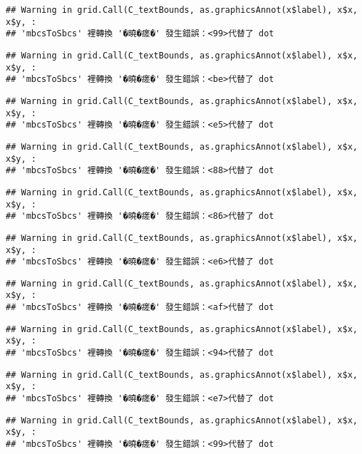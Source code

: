 \documentclass[
]{article}
\begin{document}
\begin{verbatim}
## Warning in grid.Call(C_textBounds, as.graphicsAnnot(x$label), x$x, x$y, :
## 'mbcsToSbcs' 裡轉換 '�曉�瘥�' 發生錯誤：<99>代替了 dot
\end{verbatim}

\begin{verbatim}
## Warning in grid.Call(C_textBounds, as.graphicsAnnot(x$label), x$x, x$y, :
## 'mbcsToSbcs' 裡轉換 '�曉�瘥�' 發生錯誤：<be>代替了 dot
\end{verbatim}

\begin{verbatim}
## Warning in grid.Call(C_textBounds, as.graphicsAnnot(x$label), x$x, x$y, :
## 'mbcsToSbcs' 裡轉換 '�曉�瘥�' 發生錯誤：<e5>代替了 dot
\end{verbatim}

\begin{verbatim}
## Warning in grid.Call(C_textBounds, as.graphicsAnnot(x$label), x$x, x$y, :
## 'mbcsToSbcs' 裡轉換 '�曉�瘥�' 發生錯誤：<88>代替了 dot
\end{verbatim}

\begin{verbatim}
## Warning in grid.Call(C_textBounds, as.graphicsAnnot(x$label), x$x, x$y, :
## 'mbcsToSbcs' 裡轉換 '�曉�瘥�' 發生錯誤：<86>代替了 dot
\end{verbatim}

\begin{verbatim}
## Warning in grid.Call(C_textBounds, as.graphicsAnnot(x$label), x$x, x$y, :
## 'mbcsToSbcs' 裡轉換 '�曉�瘥�' 發生錯誤：<e6>代替了 dot
\end{verbatim}

\begin{verbatim}
## Warning in grid.Call(C_textBounds, as.graphicsAnnot(x$label), x$x, x$y, :
## 'mbcsToSbcs' 裡轉換 '�曉�瘥�' 發生錯誤：<af>代替了 dot
\end{verbatim}

\begin{verbatim}
## Warning in grid.Call(C_textBounds, as.graphicsAnnot(x$label), x$x, x$y, :
## 'mbcsToSbcs' 裡轉換 '�曉�瘥�' 發生錯誤：<94>代替了 dot
\end{verbatim}

\begin{verbatim}
## Warning in grid.Call(C_textBounds, as.graphicsAnnot(x$label), x$x, x$y, :
## 'mbcsToSbcs' 裡轉換 '�曉�瘥�' 發生錯誤：<e7>代替了 dot
\end{verbatim}

\begin{verbatim}
## Warning in grid.Call(C_textBounds, as.graphicsAnnot(x$label), x$x, x$y, :
## 'mbcsToSbcs' 裡轉換 '�曉�瘥�' 發生錯誤：<99>代替了 dot
\end{verbatim}
\end{document}
